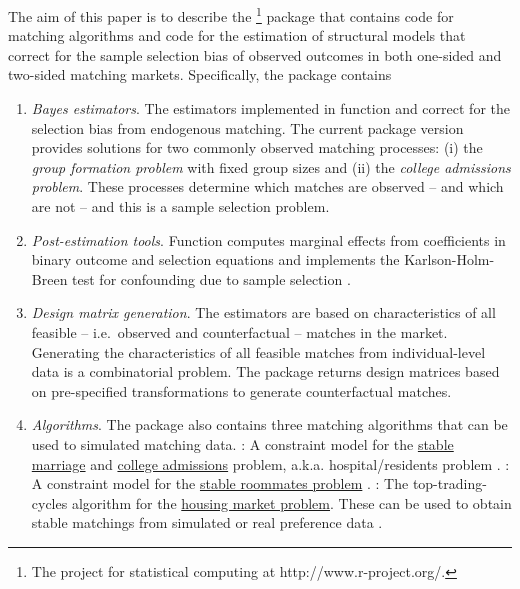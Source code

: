 The aim of this paper is to describe the \footnote{The  project for statistical computing \citep{RCoreTeam2014} at http://www.r-project.org/.} package  \citep{Klein2015b} that contains  code for matching algorithms and  code for the estimation of structural models that correct for the sample selection bias of observed outcomes in both one-sided and two-sided matching markets. 
Specifically, the  package contains
\begin{enumerate}
\item \textit{Bayes estimators}. The estimators implemented in function  and  correct for the selection bias from endogenous matching. The current package version provides solutions for two commonly observed matching processes: 
(i) the \textit{group formation problem} with fixed group sizes and
(ii) the \textit{college admissions problem}.
These processes determine which matches are observed -- and which are not -- and this is a sample selection problem.

\item \textit{Post-estimation tools}. Function  computes marginal effects from coefficients in binary outcome and selection equations and  implements the Karlson-Holm-Breen test for confounding due to sample selection \citep{Karlson2012}.

\item \textit{Design matrix generation}. The estimators are based on characteristics of all feasible -- i.e.\ observed and counterfactual -- matches in the market. Generating the characteristics of all feasible matches from individual-level data is a combinatorial problem. The package returns design matrices based on pre-specified transformations to generate counterfactual matches.

\item \textit{Algorithms}. The package also contains three matching algorithms that can be used to simulated matching data. : A constraint model \citep{Prosser2014} for the \href{http://en.wikipedia.org/wiki/Stable_marriage_problem}{stable marriage} and \href{http://en.wikipedia.org/wiki/Hospital_resident}{college admissions} problem, a.k.a. hospital/residents problem \citep[see][]{Gale1962}. : A constraint model for the \href{http://en.wikipedia.org/wiki/Stable_roommates_problem}{stable roommates problem} \citep[see][]{Gusfield1989}. : The top-trading-cycles algorithm for the \href{https://en.wikipedia.org/wiki/Top_trading_cycle}{housing market problem}. These can be used to obtain stable matchings from simulated or real preference data \citep[see][]{Shapley1974}. 


\end{enumerate}
